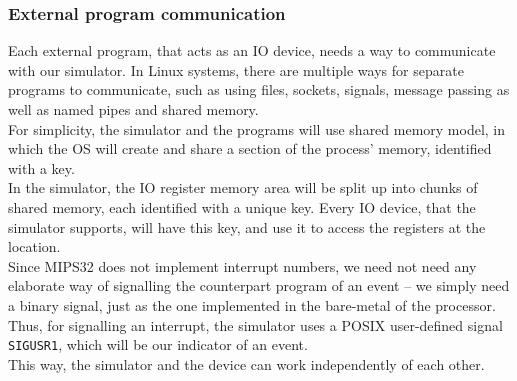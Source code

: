 \subsubsection{External program communication}
Each external program, that acts as an IO device, needs a way
to communicate with our simulator. In Linux systems, there are multiple ways for
separate programs to communicate, such as using files, sockets, signals,
message passing as well as named pipes and shared memory\cite{love2013linux}.\\
For simplicity, the simulator and the programs will use shared memory model,
in which the OS will create and share a section of the process' memory,
identified with a key.\\
In the simulator, the IO register memory area will be split up into chunks of
shared memory, each identified with a unique key. Every IO device, that the
simulator supports, will have this key, and use it to access the registers at
the location.\\
Since MIPS32 does not implement interrupt numbers, we need not need any elaborate
way of signalling the counterpart program of an event -- we simply need a binary
signal, just as the one implemented in the bare-metal of the processor. Thus,
for signalling an interrupt, the simulator uses a POSIX user-defined signal
\texttt{SIGUSR1}, which will be our indicator of an event.\\
This way, the simulator and the device can work independently of each other.
